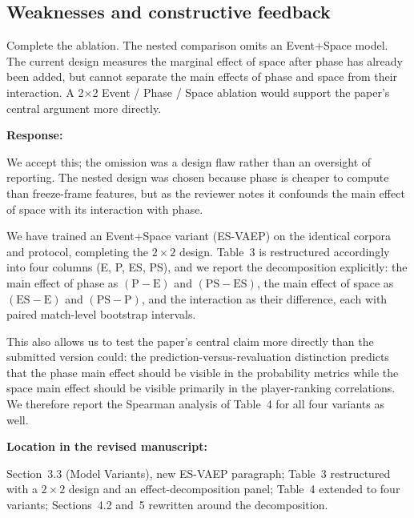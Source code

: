 \documentclass[11pt,a4paper]{article}
\newcommand{\pending}[1]{\textcolor{statuspending}{#1}}
\newcommand{\response}[2]{%
  \begin{responsebox}
  \textbf{Response:}

  #1
  \end{responsebox}
  \begin{locationbox}
  \textbf{Location in the revised manuscript:}

  #2
  \end{locationbox}
}
\begin{document}
\subsection{Weaknesses and constructive feedback}

\begin{reviewbox}[Comment 1]
Complete the ablation. The nested comparison omits an Event+Space model. The current design measures the marginal effect of space after phase has already been added, but cannot separate the main effects of phase and space from their interaction. A 2×2 Event / Phase / Space ablation would support the paper’s central argument more directly.
\end{reviewbox}
\response{We accept this; the omission was a design flaw rather than an oversight of reporting. The nested design was chosen because phase is cheaper to compute than freeze-frame features, but as the reviewer notes it confounds the main effect of space with its interaction with phase.

\pending{We have trained an Event+Space variant (ES-VAEP) on the identical corpora and protocol, completing the $2 \times 2$ design. Table~3 is restructured accordingly into four columns (E, P, ES, PS), and we report the decomposition explicitly: the main effect of phase as $(\mathrm{P} - \mathrm{E})$ and $(\mathrm{PS} - \mathrm{ES})$, the main effect of space as $(\mathrm{ES} - \mathrm{E})$ and $(\mathrm{PS} - \mathrm{P})$, and the interaction as their difference, each with paired match-level bootstrap intervals.}

\pending{This also allows us to test the paper's central claim more directly than the submitted version could: the prediction-versus-revaluation distinction predicts that the phase main effect should be visible in the probability metrics while the space main effect should be visible primarily in the player-ranking correlations. We therefore report the Spearman analysis of Table~4 for all four variants as well.}}{Section~3.3 (Model Variants), new ES-VAEP paragraph; Table~3 restructured with a $2 \times 2$ design and an effect-decomposition panel; Table~4 extended to four variants; Sections~4.2 and~5 rewritten around the decomposition.}
\end{document}
